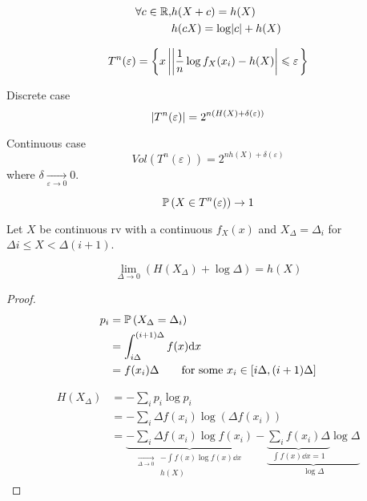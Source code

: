 \begin{proposition}
    \[
        \begin{aligned}
            \forall c \in \mathbb{R}, &h(X + c) = h(X)\\
            &h(cX) = \log \lvert c \rvert + h(X)
        \end{aligned}
    \]
\end{proposition}

\begin{definition}
    \[
        T^n(\varepsilon) = \left\{ x \left\vert \left\lvert \frac{1}{n} \log f_X(x_i) - h(X) \right\rvert \leqslant \varepsilon \right. \right\}
    \]
\end{definition}

\begin{proposition}
    Discrete case
    \[
        \left\lvert T^n(\varepsilon)\right\rvert = 2^{n(H(X) + \delta(\varepsilon))}
    \]

    Continuous case
    \[
        Vol(T^n(\varepsilon)) = 2^{nh(X) + \delta(\varepsilon)}
    \]
    where $\delta \underset{\varepsilon \to 0}{\to} 0$.
\end{proposition}

\begin{proposition}
    \[
        \mathbb{P}\left( X \in T^n(\varepsilon) \right) \to 1
    \]
\end{proposition}

Let $X$ be continuous rv with a continuous $f_X(x)$ and $X_\Delta = \Delta_i$ for $\Delta i \leqslant X < \Delta(i+1)$.

\begin{theorem}
    \[
        \lim\limits_{\Delta \to 0}( H(X_\Delta) + \log \Delta) = h(X)
    \]
\end{theorem}
\begin{proof}
    \[
        \begin{aligned}
            p_i &= \mathbb{P}\left( X_\Delta = \Delta_i \right)\\
            &= \int_{i\Delta}^{(i+1)\Delta} f(x) \mathrm{d} x\\
            &= f(x_i) \Delta \text{\qquad for some }x_i\in [i\Delta, (i+1)\Delta]
        \end{aligned}
    \]
    
    \[
        \begin{aligned}
            H(X_\Delta) &= - \sum\limits_i p_i\log p_i\\
            &= - \sum\limits_i \Delta f(x_i) \log (\Delta f(x_i))\\
            &= \underbrace{- \sum\limits_i \Delta f(x_i) \log f(x_i)}_{\scriptscriptstyle \begin{aligned}\underset{\Delta \to 0}{\to} &-\int f(x) \log f(x)\dd x \\ &h(X) \end{aligned}} - \underbrace{\underbrace{\sum\limits_i f(x_i) \Delta}_{\int f(x) \dd x = 1} \log \Delta}_{\log \Delta}
        \end{aligned}            
    \]
\end{proof}

